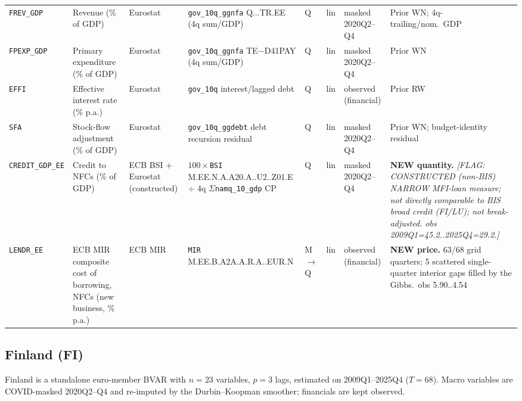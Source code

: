 {\begin{longtable}{@{}p{1.9cm}p{2.9cm}p{1.5cm}p{2.7cm}p{0.7cm}p{1.0cm}p{1.6cm}p{2.4cm}@{}}
\texttt{FREV\_GDP}    & Revenue (\% of GDP)               & Eurostat & \texttt{gov\_10q\_ggnfa} Q...TR.EE (4q sum/GDP)        & Q & lin & masked 2020Q2--Q4 & Prior WN; 4q-trailing/nom.\ GDP \\
\texttt{FPEXP\_GDP}   & Primary expenditure (\% of GDP)   & Eurostat & \texttt{gov\_10q\_ggnfa} TE$-$D41PAY (4q sum/GDP)      & Q & lin & masked 2020Q2--Q4 & Prior WN \\
\texttt{EFFI}         & Effective interest rate (\% p.a.) & Eurostat & \texttt{gov\_10q} interest/lagged debt                 & Q & lin & observed (financial) & Prior RW \\
\texttt{SFA}          & Stock-flow adjustment (\% of GDP) & Eurostat & \texttt{gov\_10q\_ggdebt} debt recursion residual      & Q & lin & masked 2020Q2--Q4 & Prior WN; budget-identity residual \\
\texttt{CREDIT\_GDP\_EE} & Credit to NFCs (\% of GDP)     & ECB BSI + Eurostat (constructed) & $100\times$\texttt{BSI} M.\allowbreak EE.\allowbreak N.\allowbreak A.\allowbreak A20.\allowbreak A.\allowbreak 1.\allowbreak U2.\allowbreak 2240.\allowbreak Z01.\allowbreak E $\div$ 4q $\Sigma$\texttt{namq\_10\_gdp} CP & Q & lin & masked 2020Q2--Q4 & \textbf{NEW quantity.} \textit{[FLAG: CONSTRUCTED (non-BIS) NARROW MFI-loan measure; not directly comparable to BIS broad credit (FI/LU); not break-adjusted. obs 2009Q1=45.2..2025Q4=29.2.]} \\
\texttt{LENDR\_EE}    & ECB MIR composite cost of borrowing, NFCs (new business, \% p.a.) & ECB MIR & \texttt{MIR} M.\allowbreak EE.\allowbreak B.\allowbreak A2A.\allowbreak A.\allowbreak R.\allowbreak A.\allowbreak 2240.\allowbreak EUR.\allowbreak N & M$\to$Q & lin & observed (financial) & \textbf{NEW price.} 63/68 grid quarters; 5 scattered single-quarter interior gaps filled by the Gibbs.\ obs 5.90..4.54 \\
\end{longtable}}

\subsection{Finland (FI)}\label{sec:data:FI}
Finland is a standalone euro-member BVAR with $n=23$ variables,
$p=3$ lags, estimated on 2009Q1--2025Q4 ($T=68$).  Macro variables are
COVID-masked 2020Q2--Q4 and re-imputed by the Durbin--Koopman smoother;
financials are kept observed.

